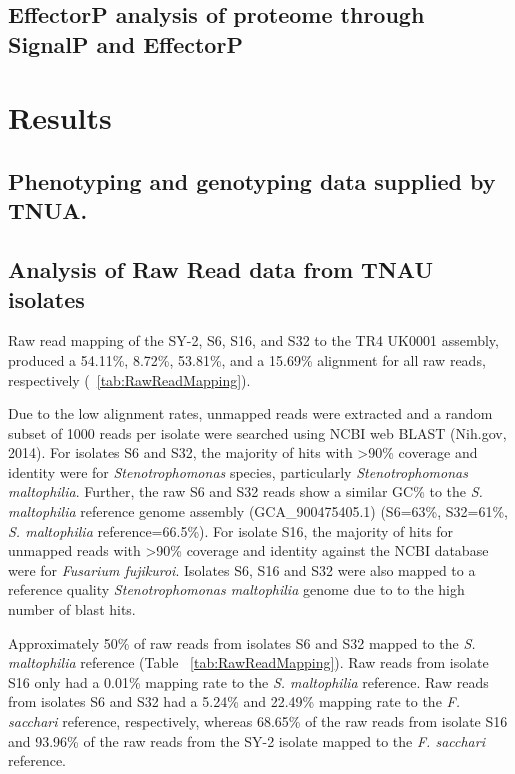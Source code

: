 \subsection{EffectorP analysis of proteome through SignalP and EffectorP}


\section{Results}
\subsection{Phenotyping and genotyping data supplied by TNUA.}

\subsection{Analysis of Raw Read data from TNAU isolates}

Raw read mapping of the SY-2, S6, S16, and S32 to the \Focub TR4 UK0001 assembly, produced a 54.11\%, 8.72\%, 53.81\%, and a 15.69\% alignment for all raw reads, respectively (~\ref{tab:RawReadMapping}). 

Due to the low alignment rates, unmapped reads were extracted and a random subset of 1000 reads per isolate were searched using NCBI web BLAST (Nih.gov, 2014). For isolates S6 and S32, the majority of hits with >90\% coverage and identity were for \textit{Stenotrophomonas} species, particularly \textit{Stenotrophomonas maltophilia}. Further, the raw S6 and S32 reads show a similar GC\% to the \textit{S. maltophilia }reference genome assembly (GCA\_900475405.1) (S6=63\%, S32=61\%, \textit{S. maltophilia} reference=66.5\%). For isolate S16, the majority of hits for unmapped reads with >90\% coverage and identity against the NCBI database were for \textit{Fusarium fujikuroi}. Isolates S6, S16 and S32 were also mapped to a reference quality \textit{Stenotrophomonas maltophilia} genome due to to the high number of blast hits. 

Approximately 50\% of raw reads from isolates S6 and S32 mapped to the \textit{S. maltophilia} reference (Table ~\ref{tab:RawReadMapping}). Raw reads from isolate S16 only had a 0.01\% mapping rate to the \textit{S. maltophilia} reference. Raw reads from isolates S6 and S32 had a 5.24\% and 22.49\% mapping rate to the \textit{F. sacchari} reference, respectively, whereas 68.65\% of the raw reads from isolate S16  and 93.96\% of the raw reads from the SY-2 isolate mapped to the \textit{F. sacchari} reference.  

